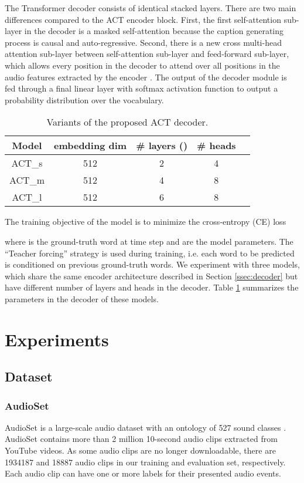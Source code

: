 \documentclass{article}
\begin{document}
\begin{sloppy}
The Transformer decoder consists of  identical stacked layers. There are two main differences compared to the ACT encoder block. First, the first self-attention sub-layer in the decoder is a masked self-attention because the caption generating process is causal and auto-regressive. Second, there is a new cross multi-head attention sub-layer between self-attention sub-layer and feed-forward sub-layer, which allows every position in the decoder to attend over all positions in the audio features extracted by the encoder \cite{vaswani2017attention}. The output of the decoder module is fed through a final linear layer with softmax activation function to output a probability distribution over the vocabulary. 

\begin{table}[!t]
    \centering
    \begin{tabular}{c c c c c}
    \hline 
    Model & embedding dim & \# layers () & \# heads\\
    \hline 
    ACT\_s & 512 & 2 & 4 \\
    ACT\_m & 512 & 4 & 8 \\
    ACT\_l & 512 & 6 & 8 \\
    \hline
    \end{tabular}
    \caption{Variants of the proposed ACT decoder. }
    \label{table:models_arch}
\end{table}

The training objective of the model is to minimize the cross-entropy (CE) loss

where  is the ground-truth word at time step  and  are the model parameters. The ``Teacher forcing'' strategy is used during training, i.e. each word to be predicted is conditioned on previous ground-truth words. We experiment with three models, which share the same encoder architecture described in Section \ref{ssec:decoder} but have different number of layers and heads in the decoder. Table \ref{table:models_arch} summarizes the parameters in the decoder of these models.

\section{Experiments}
\label{sec:exp}
\subsection{Dataset}
\label{ssec:dataset}

\subsubsection{AudioSet}
\label{sssec:audioset}
AudioSet is a large-scale audio dataset with an ontology of 527 sound classes \cite{audioset}. AudioSet contains more than \num{2} million 10-second audio clips extracted from YouTube videos. As some audio clips are no longer downloadable, there are \num{1934187} and \num{18887} audio clips in our training and evaluation set, respectively. Each audio clip can have one or more labels for their presented audio events.


\end{sloppy}
\end{document}
